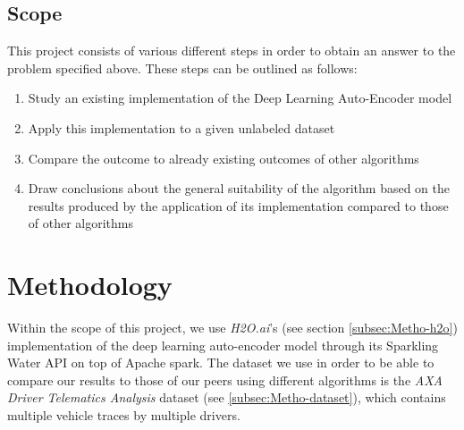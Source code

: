 \documentclass{vldb}
\begin{document}
\subsection{Scope}\label{ssec:scope}
This project consists of various different steps in order to obtain an answer to the problem specified above.
These steps can be outlined as follows:
\begin{enumerate}
	\item Study an existing implementation of the Deep Learning Auto-Encoder model
	\item Apply this implementation to a given unlabeled dataset
	\item Compare the outcome to already existing outcomes of other algorithms
	\item Draw conclusions about the general suitability of the algorithm based on the results produced by the application of its implementation compared to those of other algorithms
\end{enumerate}

\section{Methodology}
Within the scope of this project, we use \textit{H2O.ai}'s (see section \ref{subsec:Metho-h2o}) implementation of the deep learning auto-encoder model through its Sparkling Water API on top of Apache spark. The dataset we use in order to be able to compare our results to those of our peers using different algorithms is the \textit{AXA Driver Telematics Analysis} dataset (see \ref{subsec:Metho-dataset}), which contains multiple vehicle traces by multiple drivers. 
\end{document}
